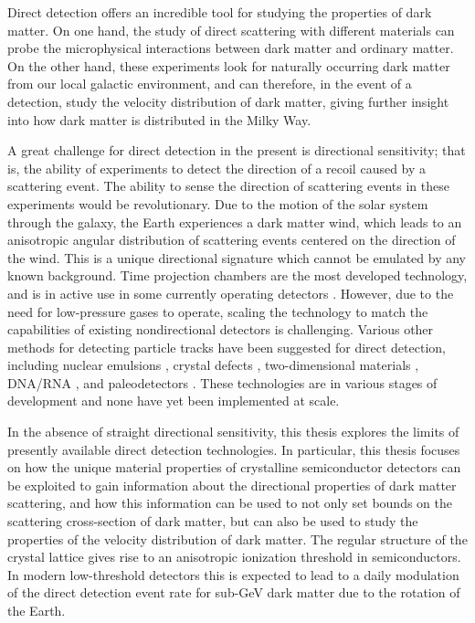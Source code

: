 \documentclass[b5paper, 10pt, twoside]{book}
\begin{document}
Direct detection offers an incredible tool for studying the properties of dark matter. On one hand, the study of direct scattering with different materials can probe the microphysical interactions between dark matter and ordinary matter. On the other hand, these experiments look for naturally occurring dark matter from our local galactic environment, and can therefore, in the event of a detection, study the velocity distribution of dark matter, giving further insight into how dark matter is distributed in the Milky Way.

A great challenge for direct detection in the present is directional sensitivity; that is, the ability of experiments to detect the direction of a recoil caused by a scattering event. The ability to sense the direction of scattering events in these experiments would be revolutionary. Due to the motion of the solar system through the galaxy, the Earth experiences a dark matter wind, which leads to an anisotropic angular distribution of scattering events centered on the direction of the wind. This is a unique directional signature which cannot be emulated by any known background. Time projection chambers are the most developed technology, and is in active use in some currently operating detectors \parencites{BattatEtAl2017, IkedaEtAl2021}. However, due to the need for low-pressure gases to operate, scaling the technology to match the capabilities of existing nondirectional detectors is challenging. Various other methods for detecting particle tracks have been suggested for direct detection, including nuclear emulsions \parencite{AgafonovaEtAl2018}, crystal defects \parencites{RajendranEtAl2017, MarshallEtAl2021}, two-dimensional materials \parencites{CapparelliEtAl2015, MarshallEtAl2021, BaracchiniEtAl2018}, DNA/RNA \parencites{DrukierEtAl2012, OHareEtAl2022}, and paleodetectors \parencite{BaumEtAl2020}. These technologies are in various stages of development and none have yet been implemented at scale.

In the absence of straight directional sensitivity, this thesis explores the limits of presently available direct detection technologies. In particular, this thesis focuses on how the unique material properties of crystalline semiconductor detectors can be exploited to gain information about the directional properties of dark matter scattering, and how this information can be used to not only set bounds on the scattering cross-section of dark matter, but can also be used to study the properties of the velocity distribution of dark matter. The regular structure of the crystal lattice gives rise to an anisotropic ionization threshold in semiconductors. In modern low-threshold detectors this is expected to lead to a daily modulation of the direct detection event rate for sub-GeV dark matter due to the rotation of the Earth. 
\end{document}
